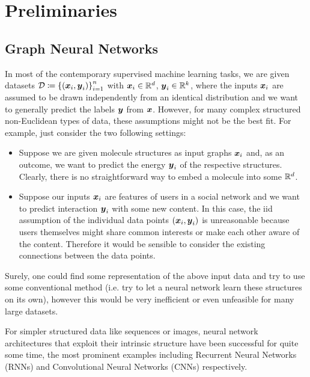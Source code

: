 \section{Preliminaries}
\label{section:preleminaries}

\subsection{Graph Neural Networks}

In most of the contemporary supervised machine learning tasks, we are given 
datasets
$\mathcal{D} \coloneqq \left\{(\boldsymbol{x}_i, \boldsymbol{y}_i)\right\}_{i=1}^n$ with $\boldsymbol{x}_i \in \mathbb{R}^{d}$, $\boldsymbol{y}_i \in \mathbb{R}^k$,
where the inputs $\boldsymbol{x}_i$ are assumed to be drawn independently from an identical 
distribution and we want to generally predict the labels $\boldsymbol{y}$ from $\boldsymbol{x}$.
However, for many complex structured non-Euclidean types of data, these assumptions might 
not be the best fit. For example, just consider the two following settings:
\begin{itemize}
    \item Suppose we are given molecule structures as input graphs $\boldsymbol{x}_i$ and, as an 
          outcome, we want to predict the energy $\boldsymbol{y}_i$ of the respective structures. 
          Clearly, there is no straightforward way to embed a molecule into some $\mathbb{R}^d$.
    \item Suppose our inputs $\boldsymbol{x}_i$ are features of users in a social network
          and we want to predict interaction $\boldsymbol{y}_i$ with some new content. In this 
          case, the iid assumption of the individual data points $(\boldsymbol{x}_i, \boldsymbol{y}_i)$ is 
          unreasonable because users themselves might share common interests 
          or make each other aware of the content. Therefore it would be sensible to consider the 
          existing connections between the data points.
\end{itemize}
Surely, one could find some representation of the above input data and try to use some
conventional method (i.e. try to let a neural network learn these structures on its own),
however this would be very inefficient or even unfeasible for many large datasets. 

For simpler structured data like sequences or images, neural
network architectures that exploit their intrinsic structure have been successful for quite some time, the 
most prominent examples including Recurrent Neural Networks (RNNs) and
Convolutional Neural Networks (CNNs) respectively. 



